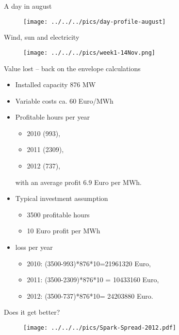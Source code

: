 {A day in august}
\begin{figure}[htp]
\centering
\texttt{[image: ../../../pics/day-profile-august]}
\end{figure}




{Wind, sun and electricity}
\begin{figure}[htp]
\centering
\texttt{[image: ../../../pics/week1-14Nov.png]}
\end{figure}






{Value lost -- back on the envelope calculations}
\begin{itemize}
\item<1-> Installed capacity 876 MW
\item<2-> Variable costs ca. 60 Euro/MWh
\item<3-> Profitable hours per year
\begin{itemize}
\item  2010 (993),
\item 2011 (2309),
\item 2012 (737),
\end{itemize}
with an average profit 6.9 Euro per MWh.
\item<4-> Typical investment assumption
\begin{itemize}
\item 3500 profitable hours
\item 10 Euro profit per MWh
\end{itemize}
\item<5-> loss per year
\begin{itemize}
\item  2010: (3500-993)*876*10=21961320 Euro,
\item 2011:  (3500-2309)*876*10 = 10433160 Euro,
\item 2012: (3500-737)*876*10= 24203880 Euro.
\end{itemize}

\end{itemize}





{Does it get better?}
\begin{figure}[htp]
\centering
\texttt{[image: ../../../pics/Spark-Spread-2012.pdf]}
\end{figure}




